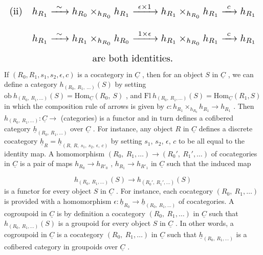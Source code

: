 \begin{equation*}
\resizebox{\textwidth}{!}{$\begin{gathered}
(\mathrm{ii}) \quad h_{R_1} \xrightarrow{\ \sim\ } h_{R_0} \times_{h_{R_0}} h_{R_1} \xrightarrow{\ \epsilon \times 1\ } h_{R_1} \times_{h_{R_0}} h_{R_1} \xrightarrow{\ c\ } h_{R_1}
\\[2ex]
\phantom{(\mathrm{ii})} \quad h_{R_1} \xrightarrow{\ \sim\ } h_{R_1} \times_{h_{R_0}} h_{R_0} \xrightarrow{\ 1 \times \epsilon\ } h_{R_1} \times_{h_{R_0}} h_{R_1} \xrightarrow{\ c\ } h_{R_1}
\\[1ex]
\text{are both identities.}
\end{gathered}$}
\end{equation*}
If  $(R_0, R_1, s_1, s_2, \epsilon, c)$  is a cocategory in $\underline{C}$ , then for an object $S$ in $\underline{C}$ , we can define a category  $h_{(R_0,\ R_1,\ \ldots)}(S)$  by setting  $\mathrm{ob}\ h_{(R_0,\ R_1,\ldots)}(S) = \mathrm{Hom}_{\underline{C}}(R_0,\ S)$ , and  $\mathrm{Fl}\ h_{(R_0,\ R_1,\ldots)}(S) = \mathrm{Hom}_{\underline{C}}(R_1,S)$  in which the composition rule of arrows is given by  $c : h_{R_1} \times_{h_{R_0}} h_{R_1} \to h_{R_1}$ . Then $h_{(R_0,\ R_1,\ldots)} : \underline{C} \to$ (categories)  is a functor and in turn defines a cofibered category $\underline{h}_{(R_0,\ R_1,\ldots)}$ over $\underline{C}$ . For instance, any object $R$ in $\underline{C}$ defines a discrete cocategory $\underline{h}_R = \underline{h}_{(R,\ R,\ s_1,\ s_2,\ \epsilon,\ c)}$ by setting $s_1$, $s_2$, $\epsilon$, $c$ to be all equal to the identity map. A homomorphism  $(R_0,\ R_1,\ldots) \to (R_0{}',\ R_1{}',\ldots)$
of cocategories in $\underline{C}$ is a pair of maps $h_{R_0} \to h_{R'_0}$ , $h_{R_1} \to h_{R'_1}$ in $\underline{C}$ such that the induced map

\begin{equation*}
h_{(R_0,\ R_1,\ldots)}(S) \to h_{(R_0',\ R_1',\ldots)}(S)
\end{equation*}
is a functor for every object $S$ in $\underline{C}$ . For instance, each cocategory $(R_0,\ R_1,\ldots)$ is provided with a homomorphism $\epsilon : \underline{h}_{R_0} \to \underline{h}_{(R_0,\ R_1,\ldots)}$ of cocategories. A cogroupoid in $\underline{C}$ is by definition a cocategory $(R_0,\ R_1,\ldots)$ in $\underline{C}$ such that $h_{(R_0,\ R_1,\ldots)}(S)$ is a groupoid for every object $S$ in $\underline{C}$ . In other words, a cogroupoid in $\underline{C}$ is a cocategory $(R_0,\ R_1,\ldots)$ in $\underline{C}$ such that $\underline{h}_{(R_0,\ R_1,\ldots)}$ is a cofibered category in groupoids over $\underline{C}$ .

